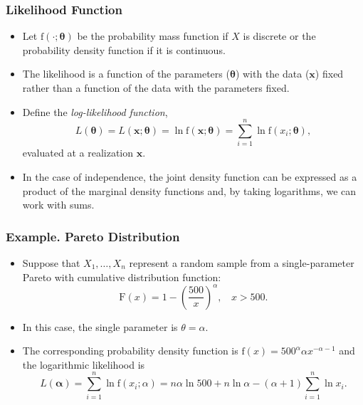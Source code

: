 \documentclass{beamer}
\begin{document}
\begin{frame}[shrink=2]
\frametitle{Likelihood Function}
\begin{itemize}
\item Let $\mathrm{f}(\cdot;\boldsymbol\theta)$ be the probability mass function if $X$ is discrete or the probability density function if it is continuous.
\item The likelihood is a function of the parameters ($\boldsymbol \theta$) with the data ($\mathbf{x}$)  fixed rather than a function of the data with the parameters fixed.
\item Define the \emph{log-likelihood function},
\begin{equation*}
L(\boldsymbol \theta) = L(\mathbf{x};\boldsymbol \theta ) = \ln \mathrm{f}(\mathbf{x};\boldsymbol \theta) = \sum_{i=1}^n \ln \mathrm{f}(x_i;\boldsymbol \theta),
\end{equation*}
evaluated at a realization $\mathbf{x}$.
\item In the case of independence, the joint density function can be expressed as a product of the marginal
density functions and, by taking logarithms, we can work with sums.

\end{itemize}
\end{frame}

\begin{frame}[shrink=2]
\frametitle{Example. Pareto Distribution}
\begin{itemize}
\item Suppose that $X_1, \ldots, X_n$ represent a random sample from a single-parameter Pareto with cumulative distribution function:
\begin{equation*}
\mathrm{F}(x) = 1- \left(\frac{500}{x}\right)^{\alpha}, ~~~~ x>500 .
\end{equation*}
\item In this case, the single parameter is $\theta = \alpha$.
\item The corresponding probability density function is $\mathrm{f}(x) = 500^{\alpha} \alpha x^{-\alpha-1}$
and the logarithmic likelihood is
\begin{equation*}
L(\boldsymbol \alpha) = \sum_{i=1}^n \ln \mathrm{f}(x_i;\alpha) = n \alpha \ln 500 +n \ln \alpha -(\alpha+1)  \sum_{i=1}^n \ln x_i .
\end{equation*}
\end{itemize}
\end{frame}
\end{document}
